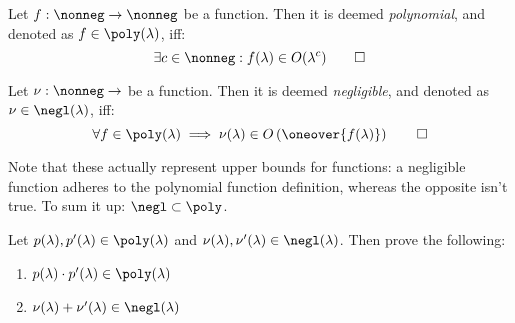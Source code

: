 \begin{definition}
    Let $f : \nonneg \to \nonneg$ be a function. Then it is deemed \emph{polynomial}, and denoted as $f \in \poly(\lambda)$, iff:
    \[
        \exists c \in \nonneg : f(\lambda) \in O(\lambda^c) \qedhere
    \]
\end{definition}

\begin{definition}
    Let $\nu : \nonneg \to \real$ be a function. Then it is deemed \emph{negligible}, and denoted as $\nu \in \negl(\lambda)$, iff:
    \[
        \forall f \in \poly(\lambda)  \implies \nu(\lambda) \in O\left(\oneover{f(\lambda)}\right) \qedhere
    \]
\end{definition}

Note that these actually represent upper bounds for functions: a negligible function adheres to the polynomial function definition, whereas the opposite isn't true. To sum it up: $\negl \subset \poly$.

\begin{exercise}
    Let $p(\lambda), p'(\lambda) \in \poly(\lambda)$ and $\nu(\lambda), \nu'(\lambda) \in \negl(\lambda)$. Then prove the following:

    \begin{enumerate}
        \item $p(\lambda) \cdot p'( \lambda) \in  \poly(\lambda)$
        \item \label{ex:negl} $\nu(\lambda) + \nu'(\lambda) \in \negl(\lambda)$
    \end{enumerate} 
\end{exercise}

